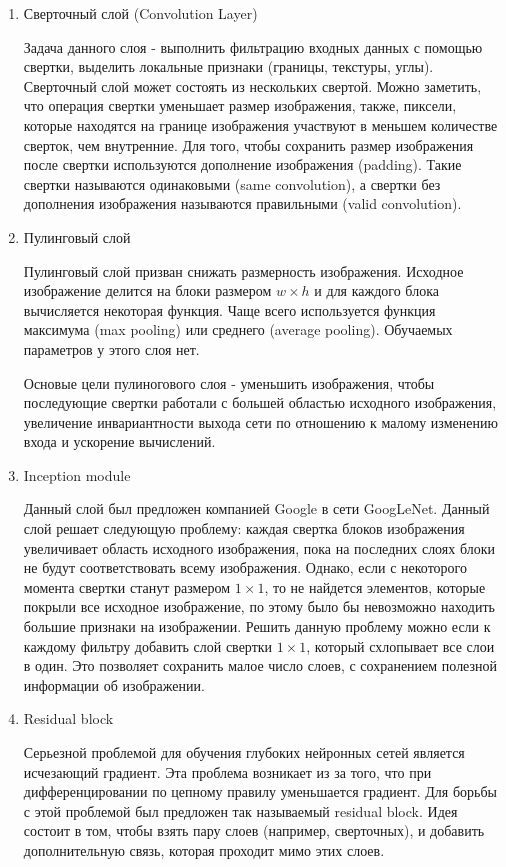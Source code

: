 {\begin{enumerate}
\item Сверточный слой (Convolution Layer)

Задача данного слоя - выполнить фильтрацию входных данных с помощью свертки, выделить локальные
признаки (границы, текстуры, углы). Сверточный слой может состоять из нескольких свертой. Можно
заметить, что операция свертки уменьшает размер изображения, также, пиксели, которые находятся на
границе изображения участвуют в меньшем количестве сверток, чем внутренние. Для того, чтобы
сохранить размер изображения после свертки используются дополнение изображения (padding). Такие
свертки называются одинаковыми (same convolution), а свертки без дополнения изображения
называются правильными (valid convolution).

\item Пулинговый слой

Пулинговый слой призван снижать размерность изображения. Исходное изображение делится на блоки
размером \(w \times h\) и для каждого блока вычисляется некоторая функция. Чаще всего используется
функция максимума (max pooling) или среднего (average pooling). Обучаемых параметров у этого слоя
нет.

Основые цели пулиногового слоя - уменьшить изображения, чтобы последующие свертки работали с
большей областью исходного изображения, увеличение инвариантности выхода сети по отношению к
малому изменению входа и ускорение вычислений.

\item Inception module

Данный слой был предложен компанией Google в сети GoogLeNet. Данный слой решает следующую
проблему: каждая свертка блоков изображения увеличивает область исходного изображения, пока на
последних слоях блоки не будут соответствовать всему изображения. Однако, если с некоторого
момента свертки станут размером \(1 \times 1\), то не найдется элементов, которые покрыли все
исходное изображение, по этому было бы невозможно находить большие признаки на
изображении. Решить данную проблему можно если к каждому фильтру добавить слой свертки \(1 \times
   1\), который схлопывает все слои в один. Это позволяет сохранить малое число слоев, с сохранением
полезной информации об изображении.

\item Residual block

Серьезной проблемой для обучения глубоких нейронных сетей является исчезающий градиент. Эта
проблема возникает из за того, что при дифференцировании по цепному правилу уменьшается
градиент. Для борьбы с этой проблемой был предложен так называемый residual block. Идея состоит
в том, чтобы взять пару слоев (например, сверточных), и добавить дополнительную связь, которая
проходит мимо этих слоев.
\end{enumerate}

}
